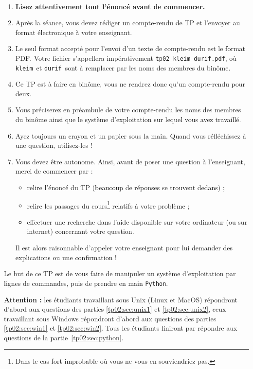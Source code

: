 \exer{[ARCHI-001]}
\setcounter{numques}{0}~\\

\begin{enumerate}
\item  \textbf{Lisez attentivement  tout l'énoncé
    avant de commencer.}
\item Après la séance, vous devez rédiger un compte-rendu de TP et
l'envoyer au format électronique à votre enseignant.
\item Le seul format accepté pour l'envoi d'un texte de compte-rendu est le
format PDF. Votre fichier s'appellera impérativement \texttt{tp02\_kleim\_durif.pdf}, où \og \texttt{kleim}\fg\ et \og \texttt{durif}\fg\ sont à remplacer par les noms des membres du binôme. 
\item Ce TP est à faire en binôme, vous ne rendrez donc qu'un compte-rendu pour deux.
\item Vous préciserez en préambule de votre compte-rendu les noms des membres du binôme ainsi que le système d'exploitation sur lequel vous avez travaillé. 
\item Ayez toujours un crayon et un papier sous la main. Quand vous réfléchissez à une question, utilisez-les !
\item Vous devez être autonome. Ainsi, avant de poser une question à l'enseignant, merci de commencer par :
\begin{itemize}
  \item relire l'énoncé du TP (beaucoup de réponses se trouvent dedans) ;
  \item relire les passages du cours\footnote{Dans le cas fort 
improbable où vous ne vous en souviendriez pas.} relatifs à votre problème ;
  \item effectuer une recherche dans l'aide disponible sur votre ordinateur (ou sur internet) concernant votre question.
\end{itemize}
  Il est alors raisonnable d'appeler votre enseignant pour lui demander des explications ou une confirmation !
\end{enumerate}

Le but de ce TP est de vous faire de manipuler un système d'exploitation par lignes de commandes, puis de prendre en main \texttt{Python}{}.

{\bf Attention :} les étudiants travaillant sous Unix (Linux et MacOS) répondront d'abord aux questions des parties \ref{tp02:sec:unix1} et \ref{tp02:sec:unix2}, ceux travaillant sous Windows répondront d'abord aux questions des parties \ref{tp02:sec:win1} et \ref{tp02:sec:win2}. Tous les étudiants finiront par répondre aux questions de la partie~\ref{tp02:sec:python}. 

